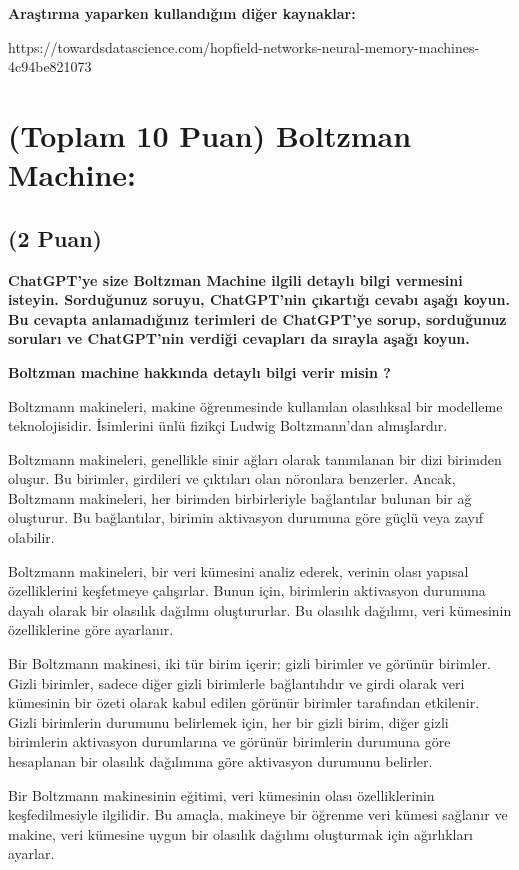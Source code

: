 \documentclass[11pt]{article}
\begin{document}
\textbf{Araştırma yaparken kullandığım diğer kaynaklar:}

https://towardsdatascience.com/hopfield-networks-neural-memory-machines-4c94be821073




\section{(Toplam 10 Puan) Boltzman Machine:}

\subsection{(2 Puan)} \textbf{ChatGPT’ye size Boltzman Machine ilgili detaylı bilgi vermesini isteyin. Sorduğunuz soruyu, ChatGPT'nin çıkartığı cevabı aşağı koyun. Bu cevapta anlamadığınız terimleri de ChatGPT’ye sorup, sorduğunuz soruları ve ChatGPT’nin verdiği cevapları da sırayla aşağı koyun.}

\textbf{Boltzman machine hakkında detaylı bilgi verir misin ?}

Boltzmann makineleri, makine öğrenmesinde kullanılan olasılıksal bir modelleme teknolojisidir. İsimlerini ünlü fizikçi Ludwig Boltzmann'dan almışlardır.

Boltzmann makineleri, genellikle sinir ağları olarak tanımlanan bir dizi birimden oluşur. Bu birimler, girdileri ve çıktıları olan nöronlara benzerler. Ancak, Boltzmann makineleri, her birimden birbirleriyle bağlantılar bulunan bir ağ oluşturur. Bu bağlantılar, birimin aktivasyon durumuna göre güçlü veya zayıf olabilir.

Boltzmann makineleri, bir veri kümesini analiz ederek, verinin olası yapısal özelliklerini keşfetmeye çalışırlar. Bunun için, birimlerin aktivasyon durumuna dayalı olarak bir olasılık dağılımı oluştururlar. Bu olasılık dağılımı, veri kümesinin özelliklerine göre ayarlanır.

Bir Boltzmann makinesi, iki tür birim içerir: gizli birimler ve görünür birimler. Gizli birimler, sadece diğer gizli birimlerle bağlantılıdır ve girdi olarak veri kümesinin bir özeti olarak kabul edilen görünür birimler tarafından etkilenir. Gizli birimlerin durumunu belirlemek için, her bir gizli birim, diğer gizli birimlerin aktivasyon durumlarına ve görünür birimlerin durumuna göre hesaplanan bir olasılık dağılımına göre aktivasyon durumunu belirler.

Bir Boltzmann makinesinin eğitimi, veri kümesinin olası özelliklerinin keşfedilmesiyle ilgilidir. Bu amaçla, makineye bir öğrenme veri kümesi sağlanır ve makine, veri kümesine uygun bir olasılık dağılımı oluşturmak için ağırlıkları ayarlar.
\end{document}
